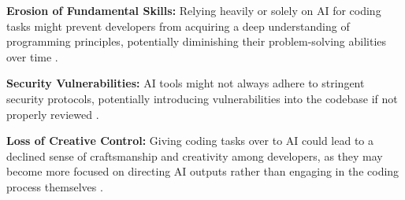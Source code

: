 \documentclass{article}  %
\begin{document}
\textbf{Erosion of Fundamental Skills:} Relying heavily or solely on AI for coding tasks might prevent developers from acquiring a deep understanding of programming principles, potentially diminishing their problem-solving abilities over time \cite{vibe_coding_dev_2025}.

\textbf{Security Vulnerabilities:} AI tools might not always adhere to stringent security protocols, potentially introducing vulnerabilities into the codebase if not properly reviewed \cite{vibe_coding_medium_2025}.

\textbf{Loss of Creative Control:} Giving coding tasks over to AI could lead to a declined sense of craftsmanship and creativity among developers, as they may become more focused on directing AI outputs rather than engaging in the coding process themselves \cite{vibe_coding_dev_2025}.


\printbibliography  %
\end{document}
